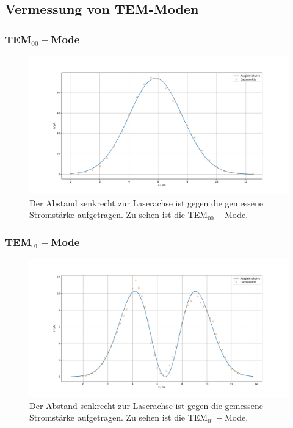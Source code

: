 \subsection{Vermessung von TEM-Moden}

\subsubsection{TEM$_{00}-$Mode}



\begin{figure}
    \centering
    \includegraphics[width=15cm]{plots/mode0.pdf}
    \caption{Der Abstand senkrecht zur Laserachse ist gegen die gemessene Stromstärke aufgetragen. Zu sehen ist die TEM$_{00}-$Mode.}
    \label{fig:mode0}
\end{figure}

\subsubsection{TEM$_{01}-$Mode}



\begin{figure}
    \centering
    \includegraphics[width=15cm]{plots/mode1.pdf}
    \caption{Der Abstand senkrecht zur Laserachse ist gegen die gemessene Stromstärke aufgetragen. Zu sehen ist die TEM$_{01}-$Mode.}
    \label{fig:mode1}
\end{figure}

